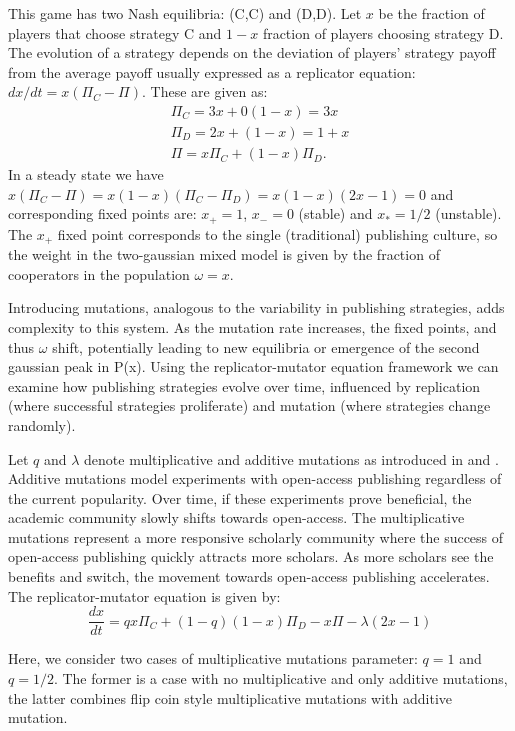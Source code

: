 \documentclass[amsfonts, amssymb, prl, superscriptaddress, notitlepage, twocolumn, nofootinbib]{revtex4-2}
\begin{document}
This game has two Nash equilibria: (C,C) and (D,D). Let $x$ be the fraction of players that choose strategy C and $1-x$ fraction of players choosing strategy D. The evolution of a strategy depends on the deviation of players' strategy payoff from the average payoff usually expressed as a replicator equation: $dx/dt = x(\Pi_C-\Pi)$. These are given as:
\begin{eqnarray}
    \Pi_C = 3x + 0(1-x) = 3x \\
    \Pi_D = 2x + (1-x) = 1+x \\
    \Pi = x\Pi_C + (1-x)\Pi_D.
\end{eqnarray}
In a steady state we have $x(\Pi_C-\Pi)=x(1-x)(\Pi_C-\Pi_D)=x(1-x)(2x-1)=0$ and corresponding fixed points are: $x_+=1$, $x_-=0$ (stable) and $x_* = 1/2$ (unstable). The $x_+$ fixed point corresponds to the single (traditional) publishing culture, so the weight in the two-gaussian mixed model is given by the fraction of cooperators in the population $\omega=x$. 

Introducing mutations, analogous to the variability in publishing strategies, adds complexity to this system. As the mutation rate increases, the fixed points, and thus $\omega$ shift, potentially leading to new equilibria or emergence of the second gaussian peak in P(x). Using the replicator-mutator equation framework we can examine how publishing strategies evolve over time, influenced by replication (where successful strategies proliferate) and mutation (where strategies change randomly). 

Let $q$ and $\lambda$ denote multiplicative and additive mutations as introduced in \cite{mobilia2010oscillatory} and \cite{mittal2020evolutionary}. Additive mutations model experiments with open-access publishing regardless of the current popularity. Over time, if these experiments prove beneficial, the academic community slowly shifts towards open-access. The multiplicative mutations represent a more responsive scholarly community where the success of open-access publishing quickly attracts more scholars. As more scholars see the benefits and switch, the movement towards open-access publishing accelerates. The replicator-mutator equation is given by:
\begin{equation}
    \frac{dx}{dt} = qx\Pi_C+(1-q)(1-x)\Pi_D-x\Pi-\lambda(2x-1)
\end{equation}

Here, we consider two cases of multiplicative mutations parameter: $q=1$ and $q=1/2$. The former is a case with no multiplicative and only additive mutations, the latter combines flip coin style multiplicative mutations with additive mutation. 
\end{document}
